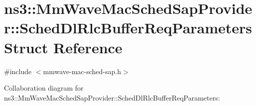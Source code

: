 \hypertarget{structns3_1_1MmWaveMacSchedSapProvider_1_1SchedDlRlcBufferReqParameters}{}\section{ns3\+:\+:Mm\+Wave\+Mac\+Sched\+Sap\+Provider\+:\+:Sched\+Dl\+Rlc\+Buffer\+Req\+Parameters Struct Reference}
\label{structns3_1_1MmWaveMacSchedSapProvider_1_1SchedDlRlcBufferReqParameters}


{\ttfamily \#include $<$mmwave-\/mac-\/sched-\/sap.\+h$>$}



Collaboration diagram for ns3\+:\+:Mm\+Wave\+Mac\+Sched\+Sap\+Provider\+:\+:Sched\+Dl\+Rlc\+Buffer\+Req\+Parameters\+:
